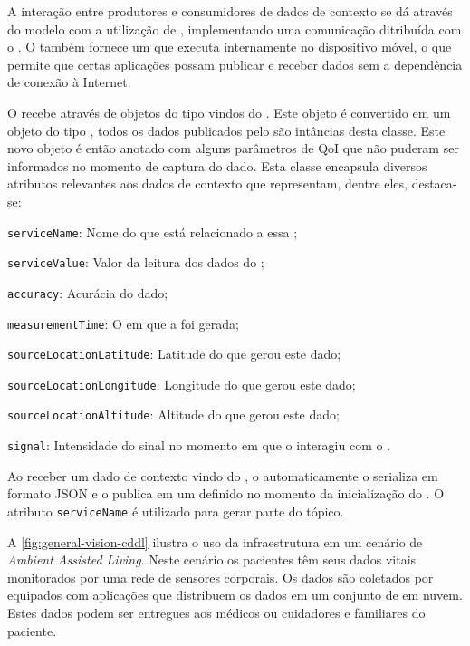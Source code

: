 A interação entre produtores e consumidores de dados de contexto se dá através do modelo \pubsub com a utilização de \brokers, implementando uma comunicação ditribuída com o \mqtt. O \cddl também fornece um \ubroker que executa internamente no dispositivo móvel, o que permite que certas aplicações possam publicar e receber dados sem a dependência de conexão à Internet.

O \cddl recebe através de \eventbus objetos do tipo \sensordata vindos do \stwopa.
Este objeto é convertido em um objeto do tipo \msg, todos os dados publicados pelo \cddl são intâncias desta classe.
Este novo objeto é então anotado com alguns parâmetros de QoI que não puderam ser informados no momento de captura do dado.
Esta classe encapsula diversos atributos relevantes aos dados de contexto que representam, dentre eles, destaca-se:

\begin{alineas}
	\item \texttt{serviceName}: Nome do \smartobj que está relacionado a essa \msg;

	\item \texttt{serviceValue}: Valor da leitura dos dados do \smartobj;

	\item \texttt{accuracy}: Acurácia do dado;

	\item \texttt{measurementTime}: O \timestamp em que a \msg foi gerada;

	\item \texttt{sourceLocationLatitude}: Latitude do \mhub que gerou este dado;

	\item \texttt{sourceLocationLongitude}: Longitude do \mhub que gerou este dado;

	\item \texttt{sourceLocationAltitude}: Altitude do \mhub que gerou este dado;

	\item \texttt{signal}: Intensidade do sinal no momento em que o \smartobj interagiu com o \stwopa.
\end{alineas}

Ao receber um dado de contexto vindo do \stwopa, o \cddl automaticamente o serializa em formato JSON e o publica em um \broker \mqtt definido no momento da inicialização do \middleware. 
O atributo \texttt{serviceName} é utilizado para gerar parte do tópico.

A \autoref{fig:general-vision-cddl} ilustra o uso da infraestrutura \mhubcddl em um cenário de \textit{Ambient Assisted Living}. Neste cenário os pacientes têm seus dados vitais monitorados por uma rede de sensores corporais.
Os dados são coletados por \smartphones equipados com aplicações \mhubcddl que distribuem os dados em um conjunto de \brokers em nuvem.  
Estes dados podem ser entregues aos médicos ou cuidadores e familiares do paciente.

